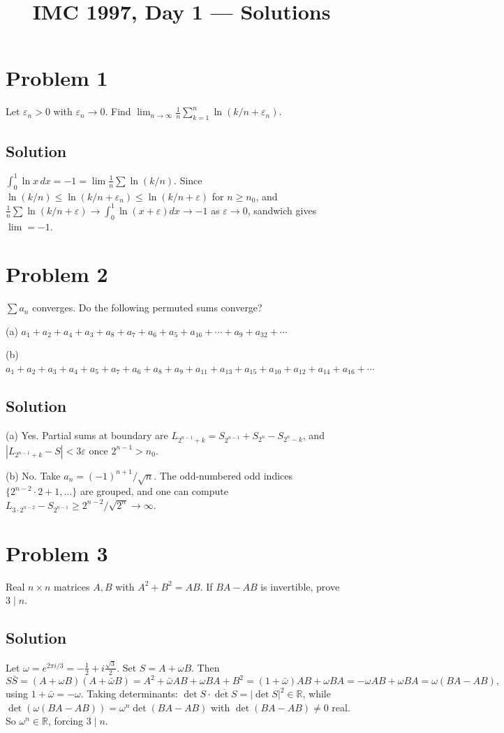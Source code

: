 \documentclass{article}
\title{IMC 1997, Day 1 --- Solutions}
\begin{document}
\maketitle

\section*{Problem 1}
Let $\varepsilon_n>0$ with $\varepsilon_n\to 0$. Find $\lim_{n\to\infty}\frac 1n\sum_{k=1}^n \ln(k/n + \varepsilon_n)$.

\subsection*{Solution}
$\int_0^1 \ln x\,dx = -1 = \lim \frac 1n\sum \ln(k/n)$. Since $\ln(k/n)\le \ln(k/n+\varepsilon_n)\le \ln(k/n+\varepsilon)$ for $n\ge n_0$, and $\frac 1n\sum\ln(k/n+\varepsilon)\to\int_0^1\ln(x+\varepsilon)dx\to -1$ as $\varepsilon\to 0$, sandwich gives $\lim = -1$.

\section*{Problem 2}
$\sum a_n$ converges. Do the following permuted sums converge?

(a) $a_1+a_2+a_4+a_3+a_8+a_7+a_6+a_5+a_{16}+\cdots+a_9+a_{32}+\cdots$

(b) $a_1+a_2+a_3+a_4+a_5+a_7+a_6+a_8+a_9+a_{11}+a_{13}+a_{15}+a_{10}+a_{12}+a_{14}+a_{16}+\cdots$

\subsection*{Solution}
(a) Yes. Partial sums at boundary are $L_{2^{n-1}+k} = S_{2^{n-1}} + S_{2^n} - S_{2^n-k}$, and $|L_{2^{n-1}+k}-S|<3\varepsilon$ once $2^{n-1}>n_0$.

(b) No. Take $a_n = (-1)^{n+1}/\sqrt n$. The odd-numbered odd indices $\{2^{n-2}\cdot 2+1, \ldots\}$ are grouped, and one can compute $L_{3\cdot 2^{n-2}} - S_{2^{n-1}} \ge 2^{n-2}/\sqrt{2^n} \to\infty$.

\section*{Problem 3}
Real $n\times n$ matrices $A,B$ with $A^2+B^2 = AB$. If $BA-AB$ is invertible, prove $3\mid n$.

\subsection*{Solution}
Let $\omega = e^{2\pi i/3} = -\frac 12 + i\frac{\sqrt 3}{2}$. Set $S = A+\omega B$. Then
\[S\bar S = (A+\omega B)(A+\bar\omega B) = A^2 + \bar\omega AB + \omega BA + B^2 = (1+\bar\omega)AB + \omega BA = -\omega AB + \omega BA = \omega(BA - AB),\]
using $1+\bar\omega = -\omega$. Taking determinants: $\det S\cdot \overline{\det S} = |\det S|^2\in\mathbb{R}$, while $\det(\omega(BA-AB)) = \omega^n\det(BA-AB)$ with $\det(BA-AB)\ne 0$ real. So $\omega^n\in\mathbb{R}$, forcing $3\mid n$.
\end{document}
